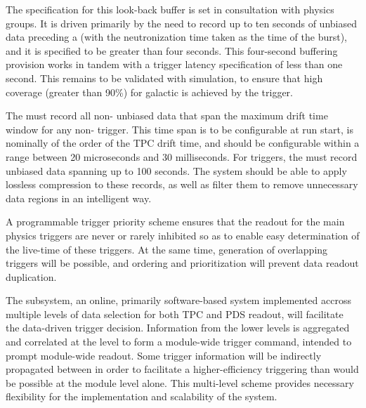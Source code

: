 The
specification for this look-back buffer is set in consultation with
physics groups. It is driven primarily by the need to record up to ten
seconds of unbiased data preceding a  (with the
neutronization time taken as the time of the burst), and it is
specified to be greater than four seconds. This four-second
buffering provision works in tandem with a trigger latency
specification of less than one second. This remains to be validated
with simulation, to ensure that high coverage (greater than 90\%) for galactic  is achieved by the  trigger.

The  must record all non- unbiased data that span the maximum drift time window for any non- trigger. 
This time span is to be configurable at run start, is nominally
of the order of the TPC drift time, and 
should be configurable within a range between 20 microseconds and 30 milliseconds. For  triggers, the  must record unbiased data spanning up to 100 seconds.
The  system should be able to %
apply lossless compression to these records, as well as
filter them %
to remove unnecessary data regions
in an intelligent way.

A programmable trigger priority scheme ensures %
that the readout for the main physics triggers
are never or rarely inhibited so as %
to enable easy determination of the live-time of
these triggers. %
At the same time, generation
of overlapping triggers will be possible, %
and ordering and prioritization will %
prevent data readout duplication. 

The  subsystem, an online, primarily software-based system implemented accross multiple levels of data selection for both TPC and PDS readout, will facilitate the data-driven trigger decision. 
Information from the
lower  levels is aggregated and correlated at the
 level to form a module-wide trigger command, intended to
prompt module-wide readout.
Some trigger information will be indirectly propagated between  in order to facilitate a higher-efficiency  triggering than would be possible at the module level alone.
This multi-level scheme provides necessary flexibility for the
implementation and scalability of the  system. 

